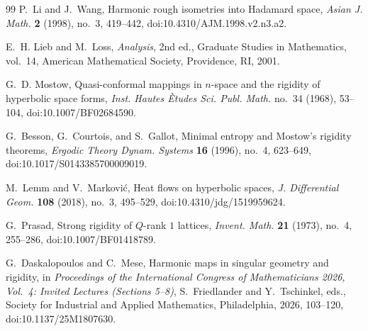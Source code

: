 \documentclass[11pt]{amsart}
\theoremstyle{plain}
\theoremstyle{plain}
\theoremstyle{plain}
\numberwithin{equation}{section}
\begin{document}
\begin{thebibliography}{99}
P.~Li and J.~Wang,
\newblock Harmonic rough isometries into Hadamard space,
\newblock \emph{Asian J. Math.} \textbf{2} (1998), no.~3, 419--442,
\newblock doi:10.4310/AJM.1998.v2.n3.a2.

E.~H. Lieb and M.~Loss,
\newblock \emph{Analysis},
\newblock 2nd ed., Graduate Studies in Mathematics, vol.~14,
American Mathematical Society, Providence, RI, 2001.

G.~D. Mostow,
\newblock Quasi-conformal mappings in \(n\)-space and the rigidity of
hyperbolic space forms,
\newblock \emph{Inst. Hautes \`Etudes Sci. Publ. Math.} no.~34 (1968),
53--104,
\newblock doi:10.1007/BF02684590.


G.~Besson, G.~Courtois, and S.~Gallot,
\newblock Minimal entropy and Mostow's rigidity theorems,
\newblock \emph{Ergodic Theory Dynam. Systems} \textbf{16} (1996),
no.~4, 623--649,
\newblock doi:10.1017/S0143385700009019.

M.~Lemm and V.~Markovi\'c,
\newblock Heat flows on hyperbolic spaces,
\newblock \emph{J. Differential Geom.} \textbf{108} (2018), no.~3,
495--529,
\newblock doi:10.4310/jdg/1519959624.

G.~Prasad,
\newblock Strong rigidity of \(Q\)-rank \(1\) lattices,
\newblock \emph{Invent. Math.} \textbf{21} (1973), no.~4, 255--286,
\newblock doi:10.1007/BF01418789.

G.~Daskalopoulos and C.~Mese,
\newblock Harmonic maps in singular geometry and rigidity,
\newblock in \emph{Proceedings of the International Congress of
Mathematicians 2026, Vol.~4: Invited Lectures (Sections 5--8)},
S.~Friedlander and Y.~Tschinkel, eds.,
Society for Industrial and Applied Mathematics, Philadelphia, 2026,
103--120,
\newblock doi:10.1137/25M1807630.



\end{thebibliography}
\end{document}
